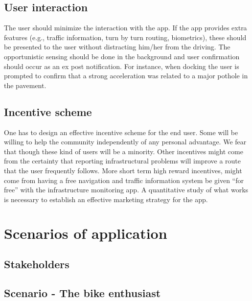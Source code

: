 \documentclass[preprint,12pt]{elsarticle}
\theoremstyle{definition}
\begin{document}
\subsection{User interaction}

The user should minimize the interaction with the app. If the app
provides extra features (e.g., traffic information, turn by turn
routing, biometrics), these should be presented to the user without
distracting him/her from the driving. The opportunistic sensing should
be done in the background and user confirmation should occur as an ex
post notification. For instance, when docking the user is prompted to
confirm that a strong acceleration was related to a major pothole in
the pavement. 


\subsection{Incentive scheme}

One has to design an effective incentive scheme for the end user. Some
will be willing to help the community independently of any personal
advantage. We fear that though these kind of users will be a
minority. Other incentives might come from the certainty that
reporting infrastructural problems will improve a route that the user
frequently follows. More short term high reward incentives, might come
from having a free navigation and traffic information system be given
``for free'' with the infrastructure monitoring app. A quantitative
study of what works is necessary to establish an effective marketing
strategy for the app.


\section{Scenarios of application}

\subsection{Stakeholders}

\subsection{Scenario - The bike enthusiast}
\end{document}

